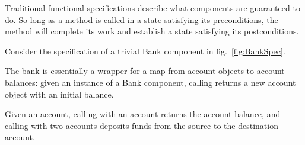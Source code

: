 {
Traditional functional specifications describe what components are
guaranteed to do. So long as a method is called in a state satisfying
its preconditions, the method will complete its work and establish a
state satisfying its postconditions.  


Consider the specification of a trivial Bank component in
fig.~\ref{fig:BankSpec}. } 
{}

The bank is essentially a wrapper for a map
from account objects to account balances: given an instance of a Bank
component, calling  returns a new account object with
an initial balance. 

Given an account, calling  with an 
account returns the account balance, and calling  with
two accounts deposits funds from the source to the destination account.

